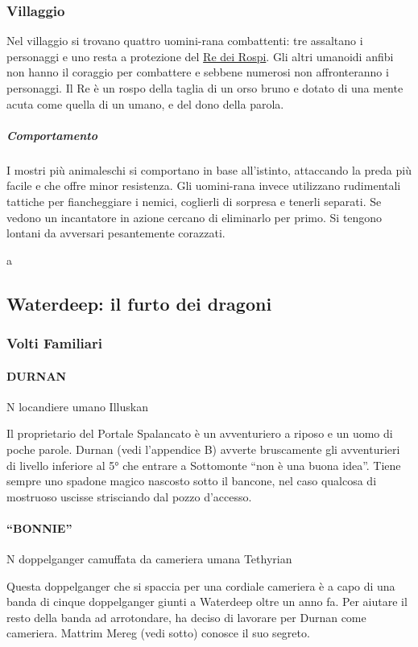 \documentclass{article}
\begin{document}
            \subsubsection{Villaggio}
Nel villaggio si trovano quattro uomini-rana combattenti: tre assaltano i personaggi e uno resta a protezione del \hyperlink{re}{Re dei Rospi}. Gli altri umanoidi anfibi non hanno il coraggio per combattere e sebbene numerosi non affronteranno i personaggi. Il Re è un rospo della taglia di un orso bruno e dotato di una mente acuta come quella di un umano, e del dono della parola.

                        \subparagraph{Comportamento}
I mostri più animaleschi si comportano in base all’istinto, attaccando la preda più facile e che offre minor resistenza. Gli uomini-rana invece utilizzano rudimentali tattiche per fiancheggiare i nemici, coglierli di sorpresa e tenerli separati. Se vedono un incantatore in azione cercano di eliminarlo per primo. Si tengono lontani da avversari pesantemente corazzati.


a
        \subsection{Waterdeep: il furto dei dragoni}

            \subsubsection{Volti Familiari}

                \paragraph{DURNAN}
N locandiere umano Illuskan

Il proprietario del Portale Spalancato è un avventuriero a riposo e un uomo di poche parole. Durnan (vedi l'appendice B) avverte bruscamente gli avventurieri di livello inferiore al 5° che entrare a Sottomonte “non è una buona idea”. Tiene sempre uno spadone magico nascosto sotto il bancone, nel caso qualcosa di mostruoso uscisse strisciando dal pozzo d'accesso.

                \paragraph{“BONNIE”}
N doppelganger camuffata da cameriera umana Tethyrian

Questa doppelganger che si spaccia per una cordiale cameriera è a capo di una banda di cinque doppelganger giunti a Waterdeep oltre un anno fa. Per aiutare il resto della banda ad arrotondare, ha deciso di lavorare per Durnan come cameriera. Mattrim Mereg (vedi sotto) conosce il suo segreto.
\end{document}
